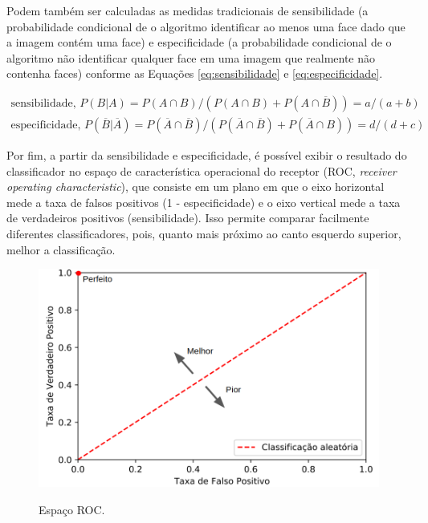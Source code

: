Podem também ser calculadas as medidas tradicionais de sensibilidade (a probabilidade condicional de o algoritmo identificar ao menos uma face dado que a imagem contém uma face) e especificidade (a probabilidade condicional de o algoritmo não identificar qualquer face em uma imagem que realmente não contenha faces) conforme as Equações \eqref{eq:sensibilidade} e \eqref{eq:especificidade}.

\begin{align} \label{eq:sensibilidade}
    \text{sensibilidade, } P(B|A) = P(A \cap B) / (P(A \cap B) + P(A \cap \overline{B})) = a/(a + b) \\
    \label{eq:especificidade}
    \text{especificidade, } P(\overline{B} | \overline{A}) = P(\overline{A} \cap \overline{B}) / (P(\overline{A} \cap \overline{B}) + P(\overline{A} \cap B)) = d/(d + c)
\end{align}

Por fim, a partir da sensibilidade e especificidade, é possível exibir o resultado do classificador no espaço de característica operacional do receptor (ROC, \textit{receiver operating characteristic}), que consiste em um plano em que o eixo horizontal mede a taxa de falsos positivos (1 - especificidade) e o eixo vertical mede a taxa de verdadeiros positivos (sensibilidade). Isso permite comparar facilmente diferentes classificadores, pois, quanto mais próximo ao canto esquerdo superior, melhor a classificação.

\begin{figure}[htb]
    \centering
    \caption{Espaço ROC.}
    \includegraphics[scale=.4]{figs/curva_roc.png}
    \label{fig:roc_space}
\end{figure}


